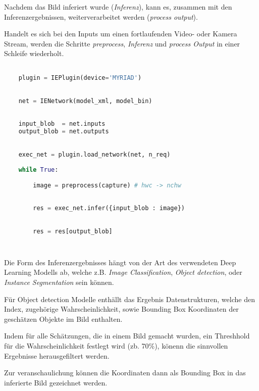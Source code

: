 Nachdem das Bild inferiert wurde (\textit{Inferenz}),
kann es, zusammen mit den Inferenzergebnissen, 
weiterverarbeitet werden (\textit{process
output}).

Handelt es sich bei den Inputs 
um einen fortlaufenden Video- oder 
Kamera Stream, werden die Schritte 
\textit{preprocess}, \textit{Inferenz} und 
\textit{process Output} in einer Schleife wiederholt.


\vspace{1cm}
\begin{minipage}{0.30\textwidth}
    \centering
    
    \label{fig:inger_engine_workflow}
\end{minipage}
\begin{minipage}{0.70\textwidth}

\begin{lstlisting}[language=Python]

    plugin = IEPlugin(device='MYRIAD')

        
    net = IENetwork(model_xml, model_bin)
        
    
    input_blob  = net.inputs
    output_blob = net.outputs
        

    exec_net = plugin.load_network(net, n_req)
        
    while True:

        image = preprocess(capture) # hwc -> nchw
        
        
        res = exec_net.infer({input_blob : image})
        

        res = res[output_blob]
        
        
\end{lstlisting}
\vspace{1.5cm}
\end{minipage}
\vspace{1cm}


Die Form des Inferenzergebnisses hängt von der 
Art des verwendeten Deep Learning Modells ab, welche 
z.B. \textit{Image Classification}, \textit{Object detection},
oder \textit{Instance
Segmentation} sein können.

Für Object detection Modelle enthällt das Ergebnis
 Datenstrukturen, welche den Index, 
 zugehörige Wahrscheinlichkeit, sowie Bounding 
 Box Koordinaten der geschätzen Objekte im Bild enthalten.

Indem für alle Schätzungen, die in einem Bild gemacht wurden, 
ein Threshhold für die Wahrscheinlichkeit festlegt wird (zb. 70\%),
könenn die sinnvollen Ergebnisse herausgefiltert werden.

Zur veranschaulichung können die Koordinaten dann 
als Bounding Box in das inferierte Bild gezeichnet werden.
